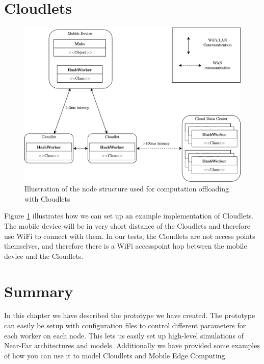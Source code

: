 \section{Cloudlets}
\begin{figure}[t]
    \centering
    \includegraphics[scale=0.9]{chapters/implementation/figures/Cloudlet_implementation.png}
    \caption{Illustration of the node structure used for computation offloading with Cloudlets}
    \label{fig:Cloudlet_implementation}
\end{figure}
Figure \ref{fig:Cloudlet_implementation} illustrates how we can set up an example implementation of Cloudlets. The mobile device will be in very short distance of the Cloudlets and therefore use WiFi to connect with them. In our tests, the Cloudlets are not access points themselves, and therefore there is a WiFi accesspoint hop between the mobile device and the Cloudlets.










\section{Summary}
In this chapter we have described the prototype we have created. The prototype can easily be setup with configuration files to control different parameters for each worker on each node. This lets us easily set up high-level simulations of Near-Far architectures and models. Additionally we have provided some examples of how you can use it to model Cloudlets and Mobile Edge Computing.